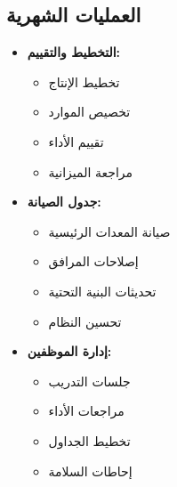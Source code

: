 \subsection{العمليات الشهرية}
\begin{itemize}
    \item \textbf{التخطيط والتقييم:}
    \begin{itemize}
        \item تخطيط الإنتاج
        \item تخصيص الموارد
        \item تقييم الأداء
        \item مراجعة الميزانية
    \end{itemize}
    
    \item \textbf{جدول الصيانة:}
    \begin{itemize}
        \item صيانة المعدات الرئيسية
        \item إصلاحات المرافق
        \item تحديثات البنية التحتية
        \item تحسين النظام
    \end{itemize}
    
    \item \textbf{إدارة الموظفين:}
    \begin{itemize}
        \item جلسات التدريب
        \item مراجعات الأداء
        \item تخطيط الجداول
        \item إحاطات السلامة
    \end{itemize}
\end{itemize}

